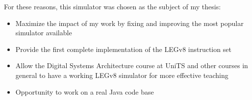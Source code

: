 For these reasons, this simulator was chosen as the subject of my thesis:

\begin{itemize}[label=\textendash]
	\item Maximize the impact of my work by fixing and improving the most popular simulator available
	\item Provide the first complete implementation of the LEGv8 instruction set
	\item Allow the Digital Systems Architecture course at UniTS and other courses in general to have a working LEGv8 simulator for more effective teaching
	\item Opportunity to work on a real Java code base
\end{itemize}